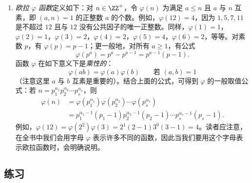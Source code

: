 \begin{enumerate}[label=(\arabic*),resume]
  \item \emph{欧拉 $\varphi$ 函数}定义如下：对 $n\in\ZZ^+$，令 $\varphi(n)$ 为满足 $a\leq n$ 且 $a$ 与 $n$ 互素，即 $(a,n)=1$ 的正整数 $a$ 的个数。例如，$\varphi(12)=4$，因为 $1,5,7,11$ 是不超过 $12$ 且与 $12$ 没有公共因子的唯一正整数。同样，$\varphi(1)=1$，$\varphi(2)=1$，$\varphi(3)=2$，$\varphi(4)=2$，$\varphi(5)=4$，$\varphi(6)=2$，等等。对素数 $p$，有 $\varphi(p)=p-1$；更一般地，对所有 $a\geq1$，有公式
  \[
    \varphi(p^a)=p^a-p^{a-1}=p^{a-1}(p-1).
  \]
  函数 $\varphi$ 在如下意义下是\emph{乘性的}：
  \[
    \varphi(ab)=\varphi(a)\varphi(b)\qquad\text{若 }(a,b)=1
  \]
  （注意这里 $a$ 与 $b$ 互素是重要的）。结合上面的公式，可得到 $\varphi$ 的一般取值公式：若 $n=p_1^{\alpha_1}p_2^{\alpha_2}\cdots p_s^{\alpha_s}$，则
  \begin{align*}
    \varphi(n)
      &=\varphi(p_1^{\alpha_1})\varphi(p_2^{\alpha_2})\cdots\varphi(p_s^{\alpha_s})\\
      &=p_1^{\alpha_1-1}(p_1-1)p_2^{\alpha_2-1}(p_2-1)\cdots p_s^{\alpha_s-1}(p_s-1).
  \end{align*}
  例如，$\varphi(12)=\varphi(2^2)\varphi(3)=2^1(2-1)3^0(3-1)=4$。读者应注意，在全书中我们会用字母 $\varphi$ 表示许多不同的函数，因此当我们要用这个字母表示欧拉函数时，会明确说明。
\end{enumerate}

\subsection*{练习}

